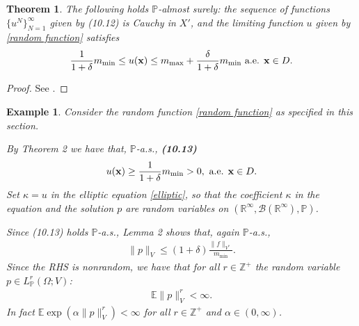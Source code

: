 \documentclass[oneside]{article}
\numberwithin{equation}{section}
\newtheorem{theorem}{Theorem}[section]
\newtheorem{example}{Example}[section]
\begin{document}
\begin{theorem}
    The following holds $\mathbb{P}$-almost surely: the sequence of functions $\{u^N\}_{N=1}^\infty$ given by (10.12) is Cauchy in $X'$, and the limiting function $u$ given by \eqref{random function} satisfies
    \begin{align*}
        \frac{1}{1 + \delta}m_{\min}\le u({\bf x})\le m_{\max} + \frac{\delta}{1 + \delta}m_{\min} \mbox{ a.e. } {\bf x}\in D.
    \end{align*}
\end{theorem}

\begin{proof}
    See \cite[pp. 322--323]{Dashti_Stuart2017}.
\end{proof}

\begin{example}
    Consider the random function \eqref{random function} as specified in this section.
    
    By Theorem 2 we have that, $\mathbb{P}$-a.s., \textbf{(10.13)}
    \begin{align*}
        u({\bf x})\ge\frac{1}{1 + \delta}m_{\min} > 0, \mbox{ a.e. } {\bf x}\in D.
    \end{align*}
    Set $\kappa = u$ in the elliptic equation \eqref{elliptic}, so that the coefficient $\kappa$ in the equation and the solution $p$ are random variables on $(\mathbb{R}^\infty,\mathcal{B}(\mathbb{R}^\infty),\mathbb{P})$.
    
    Since (10.13) holds $\mathbb{P}$-a.s., Lemma 2 shows that, again $\mathbb{P}$-a.s.,
    \begin{align*}
        \|p\|_V\le(1 + \delta)\frac{\|f\|_{V^*}}{m_{\min}}.
    \end{align*}
    Since the RHS is nonrandom, we have that for all $r\in\mathbb{Z}^+$ the random variable $p\in L_{\mathbb{P}}^r(\Omega;V)$:
    \begin{align*}
        \mathbb{E}\|p\|_V^r < \infty.
    \end{align*}
    In fact $\mathbb{E}\exp(\alpha\|p\|_V^r) < \infty$ for all $r\in\mathbb{Z}^+$ and $\alpha\in(0,\infty)$.
\end{example}
\end{document}
